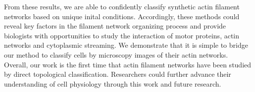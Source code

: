 \documentclass[10pt]{article}
\begin{document}
From these results, we are able to confidently classify synthetic actin filament networks based on unique inital conditions. Accordingly, these methods could reveal key factors in the filament network organizing process and provide biologists with opportunities to study the interaction of motor proteins, actin networks and cytoplasmic streaming. We demonstrate that it is simple to bridge our method to classify cells by microscopy images of their actin networks. Overall, our work is the first time that actin filament networks have been studied by direct topological classification. Researchers could further advance their understanding of cell physiology through this work and future research. 

\clearpage	


\end{document}
